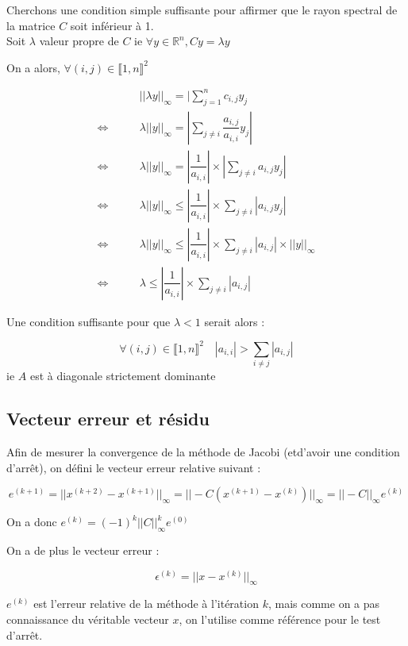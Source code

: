 \documentclass[11pt, a4paper]{article}
\begin{document}
Cherchons une condition simple suffisante pour affirmer que le rayon spectral de la matrice $C$ soit inférieur à 1.\\

Soit $\lambda$ valeur propre de $C$ ie $\forall y \in \mathbb{R}^n, Cy = \lambda y$

On a alors, $\forall (i,j) \in \llbracket 1,n \rrbracket^2$

\begin{align}
    &||\lambda y||_{\infty} = |\sum_{j=1}^{n}c_{i,j}y_j\\
    \Leftrightarrow \qquad & \lambda||y||_{\infty} = |\sum_{j \neq i}\dfrac{a_{i,j}}{a_{i,i}}y_j|\\
    \Leftrightarrow \qquad & \lambda||y||_{\infty} = |\dfrac{1}{a_{i,i}}| \times |\sum_{j \neq i}a_{i,j}y_j|\\
    \Leftrightarrow \qquad & \lambda||y||_{\infty} \leq |\dfrac{1}{a_{i,i}}| \times \sum_{j \neq i}|a_{i,j}y_j|\\
    \Leftrightarrow \qquad & \lambda||y||_{\infty} \leq |\dfrac{1}{a_{i,i}}| \times \sum_{j \neq i}|a_{i,j}| \times ||y||_{\infty}\\
    \Leftrightarrow \qquad & \lambda \leq |\dfrac{1}{a_{i,i}}| \times \sum_{j \neq i}|a_{i,j}|
\end{align}

Une condition suffisante pour que $\lambda < 1$ serait alors :

\[
\forall (i,j) \in \llbracket 1,n \rrbracket^2 \quad |a_{i,i}| > \sum_{i \neq j}|a_{i,j}|
\]
ie $A$ est à diagonale strictement dominante

\newpage 

\subsection{Vecteur erreur et résidu}

Afin de mesurer la convergence de la méthode de Jacobi (etd'avoir une condition d'arr\^et), on défini le vecteur erreur relative suivant :

\[
e^{(k+1)} = ||x^{(k+2)} - x^{(k+1)}||_{\infty} = ||-C(x^{(k+1)} - x^{(k)})||_{\infty} = ||-C||_{\infty}e^{(k)}
\]

On a donc $e^{(k)} = (-1)^k||C||_{\infty}^ke^{(0)}$

On a de plus le vecteur erreur :

\[
\epsilon^{(k)} = ||x - x^{(k)}||_{\infty}
\]

$e^{(k)}$ est l'erreur relative de la méthode à l'itération $k$, mais comme on a pas connaissance du véritable vecteur $x$, on l'utilise comme référence pour le test d'arr\^et.
\end{document}
